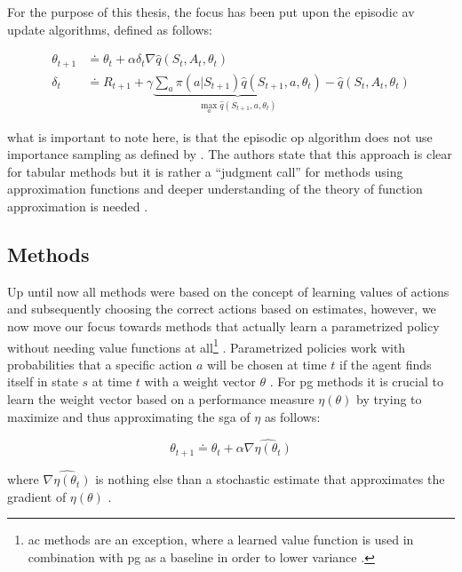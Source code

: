 \documentclass{seal_thesis}
\begin{document}
For the purpose of this thesis, the focus has been put upon the episodic \gls{av} update algorithms, defined as follows:

\begin{align}
	\theta_{t+1} &\doteq \theta_t + \alpha \delta_t \nabla \hat{q} (S_t,A_t,\theta_t)\\
	\delta_t &\doteq R_{t+1} + \gamma \underbrace{\sum_a \pi (a|S_{t+1}) \hat{q} (S_{t+1},a,\theta_t)}_{\max_a \hat{q} (S_{t+1},a,\theta_t)} - \hat{q} (S_t,A_t,\theta_t)
\end{align}

what is important to note here, is that the episodic \gls{op} algorithm does not use importance sampling as defined by  \cite[p. 244]{Sutton2017}. The authors state that this approach is clear for tabular methods but it is rather a ``judgment call'' for methods using approximation functions and deeper understanding of the theory of function approximation is needed \cite[p. 244]{Sutton2017}.

\subsection{ Methods}
\label{subsec:polgrad_methods}

Up until now all methods were based on the concept of learning values of actions and subsequently choosing the correct actions based on estimates, however, we now move our focus towards methods that actually learn a parametrized policy without needing value functions at all\footnote{\gls{ac} methods are an exception, where a learned value function is used in combination with \gls{pg} as a baseline in order to lower variance \cite{Sutton2017}.}  \cite[p. 265]{Sutton2017}. Parametrized policies work with probabilities that a specific action $a$ will be chosen at time $t$ if the agent finds itself in state $s$ at time $t$ with a weight vector $\theta$ \cite[p. 265]{Sutton2017}. For \gls{pg} methods it is crucial to learn the weight vector based on a performance measure $\eta(\theta)$ by trying to maximize and thus approximating the \gls{sga} of $\eta$ as follows:

\begin{equation}
	\theta_{t+1} \doteq \theta_t + \alpha \widehat{\nabla \eta (\theta_t)}
\end{equation}

where $ \widehat{\nabla \eta (\theta_t)}$ is nothing else than a stochastic estimate that approximates the gradient of $\eta(\theta)$ \cite[p. 265]{Sutton2017}.
\end{document}
